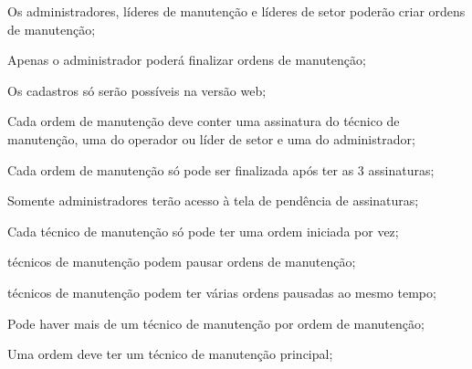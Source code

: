 \begin{subalineas}
	\item {Os administradores, líderes de manutenção e líderes de setor poderão criar ordens de manutenção};
	\item {Apenas o administrador poderá finalizar ordens de manutenção};
	\item {Os cadastros só serão possíveis na versão web};
	\item {Cada ordem de manutenção deve conter uma assinatura do técnico de manutenção, uma do operador ou líder de setor e uma do administrador};
	\item {Cada ordem de manutenção só pode ser finalizada após ter as 3 assinaturas};
	\item {Somente administradores terão acesso à tela de pendência de assinaturas};
	\item {Cada técnico de manutenção só pode ter uma ordem iniciada por vez};
	\item {técnicos de manutenção podem pausar ordens de manutenção};
	\item {técnicos de manutenção podem ter várias ordens pausadas ao mesmo tempo};
	\item {Pode haver mais de um técnico de manutenção por ordem de manutenção};
	\item {Uma ordem deve ter um técnico de manutenção principal};
\end{subalineas}




